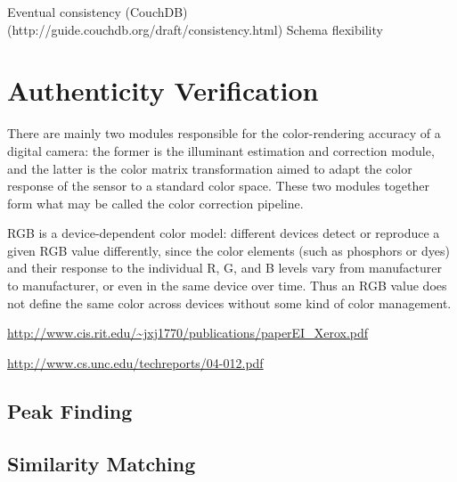 \documentclass[thesis.tex]{subfiles}
\begin{document}
Eventual consistency (CouchDB) (http://guide.couchdb.org/draft/consistency.html)
Schema flexibility

\section{Authenticity Verification}

\begin{comment}
\subsection{Color calibration}
\end{comment}
There are mainly two modules responsible for the color-rendering accuracy of a digital camera: the former is the illuminant estimation and correction module, and the latter is the color matrix transformation aimed to adapt the color response of the sensor to a standard color space. These two modules together form what may be called the color correction pipeline.

RGB is a device-dependent color model: different devices detect or reproduce a given RGB value differently, since the color elements (such as phosphors or dyes) and their response to the individual R, G, and B levels vary from manufacturer to manufacturer, or even in the same device over time. Thus an RGB value does not define the same color across devices without some kind of color management.

\url{http://www.cis.rit.edu/~jxj1770/publications/paperEI_Xerox.pdf}

\url{http://www.cs.unc.edu/techreports/04-012.pdf}

\subsection{Peak Finding}

\subsection{Similarity Matching}
\end{document}

